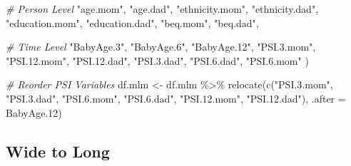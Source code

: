 \documentclass[
]{article}
\newenvironment{Shaded}{\begin{snugshade}}{\end{snugshade}}
\newcommand{\AttributeTok}[1]{\textcolor[rgb]{0.77,0.63,0.00}{#1}}
\newcommand{\CommentTok}[1]{\textcolor[rgb]{0.56,0.35,0.01}{\textit{#1}}}
\newcommand{\FloatTok}[1]{\textcolor[rgb]{0.00,0.00,0.81}{#1}}
\newcommand{\FunctionTok}[1]{\textcolor[rgb]{0.00,0.00,0.00}{#1}}
\newcommand{\NormalTok}[1]{#1}
\newcommand{\OtherTok}[1]{\textcolor[rgb]{0.56,0.35,0.01}{#1}}
\newcommand{\SpecialCharTok}[1]{\textcolor[rgb]{0.00,0.00,0.00}{#1}}
\newcommand{\StringTok}[1]{\textcolor[rgb]{0.31,0.60,0.02}{#1}}
\begin{document}
\begin{Shaded}
\begin{Highlighting}[]
                      \CommentTok{\# Person Level}
                      \StringTok{"age.mom"}\NormalTok{, }\StringTok{"age.dad"}\NormalTok{,}
                      \StringTok{"ethnicity.mom"}\NormalTok{, }\StringTok{"ethnicity.dad"}\NormalTok{,}
                      \StringTok{"education.mom"}\NormalTok{, }\StringTok{"education.dad"}\NormalTok{,}
                      \StringTok{"beq.mom"}\NormalTok{, }\StringTok{"beq.dad"}\NormalTok{,}
                      
                      \CommentTok{\# Time Level}
                      \StringTok{"BabyAge.3"}\NormalTok{, }\StringTok{"BabyAge.6"}\NormalTok{, }\StringTok{"BabyAge.12"}\NormalTok{,}
                      \StringTok{"PSI.3.mom"}\NormalTok{, }\StringTok{"PSI.12.mom"}\NormalTok{, }\StringTok{"PSI.12.dad"}\NormalTok{,}
                          \StringTok{"PSI.3.dad"}\NormalTok{, }\StringTok{"PSI.6.dad"}\NormalTok{,}
                          \StringTok{"PSI.6.mom"}
\NormalTok{                      )}

\CommentTok{\# Reorder PSI Variables}
\NormalTok{df.mlm }\OtherTok{\textless{}{-}}\NormalTok{ df.mlm }\SpecialCharTok{\%\textgreater{}\%}
  \FunctionTok{relocate}\NormalTok{(}\FunctionTok{c}\NormalTok{(}\StringTok{"PSI.3.mom"}\NormalTok{, }\StringTok{"PSI.3.dad"}\NormalTok{,}
             \StringTok{"PSI.6.mom"}\NormalTok{, }\StringTok{"PSI.6.dad"}\NormalTok{,}
             \StringTok{"PSI.12.mom"}\NormalTok{, }\StringTok{"PSI.12.dad"}\NormalTok{),}
           \AttributeTok{.after =}\NormalTok{ BabyAge}\FloatTok{.12}\NormalTok{)}
\end{Highlighting}
\end{Shaded}

\hypertarget{wide-to-long}{%
\subsection{Wide to Long}\label{wide-to-long}}
\end{document}
